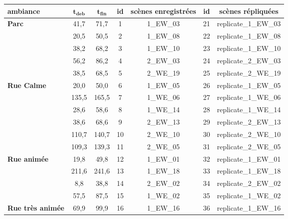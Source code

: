 \begin{table}[ht]
\centering
\begin{tabular}{|p{2cm}|c|c||c|c||c|c|}
\hline
\textbf{ambiance}                          & $\mathbf{t_{deb}}$          & $\mathbf{t_{fin}}$          & \textbf{id}   & \textbf{scènes enregistrées}         & \textbf{id}   & \textbf{scènes répliquées} \\
\hline
\multirow{5}{2cm}{\textbf{Parc}}             & 41,7 & 71,7 & 1  & 1\_EW\_03 & 21 & replicate\_1\_EW\_03         \\
                                  & 20,5 & 50,5 & 2  & 1\_EW\_08 & 22 & replicate\_1\_EW\_08         \\
                                  & 38,2 & 68,2 & 3  & 1\_EW\_10 & 23 & replicate\_1\_EW\_10         \\
                                  & 56,2 & 86,2 & 4  & 2\_EW\_03 & 24 & replicate\_2\_EW\_03         \\
                                  & 38,5 & 68,5 & 5  & 2\_WE\_19 & 25 & replicate\_2\_WE\_19         \\
\hline
\multirow{6}{2cm}{\textbf{Rue Calme}}        & 20,0 & 50,0 & 6  & 1\_EW\_05 & 26 & replicate\_1\_EW\_05     \\
                                  & 135,5 & 165,5 & 7  & 1\_WE\_06 & 27 & replicate\_1\_WE\_06     \\
                                  & 28,6 & 58,6 & 8  & 1\_WE\_14 & 28 & replicate\_1\_WE\_14     \\
                                  & 38,6 & 68,6 & 9  & 2\_EW\_13 & 29 & replicate\_2\_EW\_13     \\
                                  & 110,7 & 140,7 & 10 & 2\_WE\_10 & 30 & replicate\_2\_WE\_10     \\
                                  & 109,3 & 139,3 & 11 & 2\_WE\_05 & 31 & replicate\_2\_WE\_05     \\
\hline
\multirow{4}{2cm}{\textbf{Rue animée}}       & 19,8 & 49,8 & 12 & 1\_EW\_01 & 32 & replicate\_1\_EW\_01     \\
                                  & 211,6 & 241,6 & 13 & 1\_EW\_18 & 33 & replicate\_1\_EW\_18     \\
                                  & 8,8 & 38,8 & 14 & 2\_EW\_02 & 34 & replicate\_2\_EW\_02     \\
                                  & 57,5 & 87,5 & 15 & 1\_WE\_02 & 35 & replicate\_1\_WE\_02     \\
\hline
\multirow{5}{2cm}{\textbf{Rue très  animée}} & 69,9 & 99,9 & 16 & 1\_EW\_16 & 36 & replicate\_1\_EW\_16 \\

\end{tabular}
\end{table}
